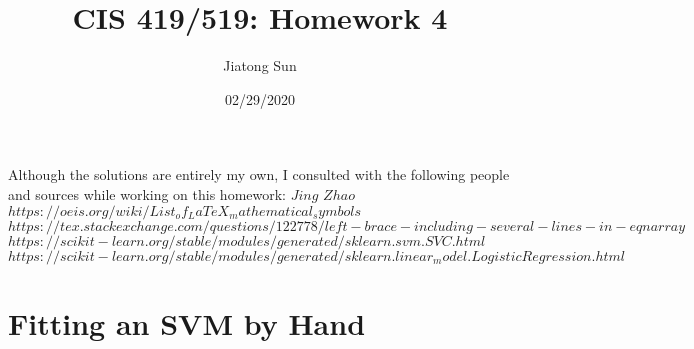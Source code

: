 \documentclass{article}
\title{CIS 419/519: Homework 4}
\author{Jiatong Sun}
\date{02/29/2020}
\begin{document}
    \maketitle
    Although the solutions are entirely my own, I consulted with the following people and sources while working on this homework: $Jing$ $Zhao$\\
$https://oeis.org/wiki/List_of_LaTeX_mathematical_symbols$\\
$https://tex.stackexchange.com/questions/122778/left-brace-including-several-lines-in-eqnarray$\\
$https://scikit-learn.org/stable/modules/generated/sklearn.svm.SVC.html$\\
$https://scikit-learn.org/stable/modules/generated/sklearn.linear_model.LogisticRegression.html$
    
    \section{Fitting an SVM by Hand}
\end{document}
